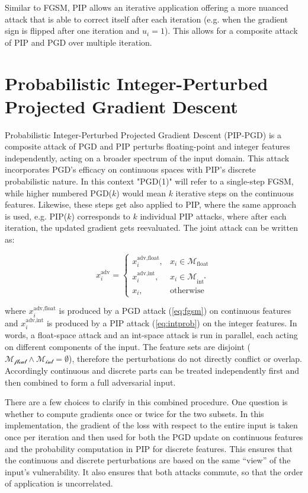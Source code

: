 Similar to FGSM, PIP allows an iterative application offering a more nuanced attack that is able to correct itself after each iteration (e.g. when the gradient sign is flipped after one iteration and $u_i=1$). This allows for a composite attack of PIP and PGD over multiple iteration. 

\section{Probabilistic Integer-Perturbed Projected Gradient Descent}
\label{sec:method_combined}

Probabilistic Integer-Perturbed Projected Gradient Descent (PIP-PGD) is a composite attack of PGD and PIP perturbs floating-point and integer features independently, acting on a broader spectrum of the input domain. This attack incorporates PGD's efficacy on continuous spaces with PIP's discrete probabilistic nature. In this context "PGD(1)" will refer to a single-step FGSM, while higher numbered PGD($k$) would mean $k$ iterative steps on the continuous features. Likewise, these steps get also applied to PIP, where the same approach is used, e.g. PIP($k$) corresponds to $k$ individual PIP attacks, where after each iteration, the updated gradient gets reevaluated. The joint attack can be written as:

\begin{equation}
x_i^{\text{adv}} = 
    \begin{cases} 
    x^{\text{adv,float}}_i, & x_i\in\mathcal{M}_{\text{float}} \\[4pt]
    x^{\text{adv,int}}_i,   & x_i\in\mathcal{M}_{\text{int}^*}   \\[4pt]
    x_i, & \text{otherwise}
    \end{cases}
\label{eq:joint_attack}
\end{equation}

where $x^{\text{adv,float}}_i$ is produced by a PGD attack (\ref{eq:fgsm}) on continuous features and $x^{\text{adv,int}}_i$ is produced by a PIP attack (\ref{eq:intprob}) on the integer features. In words, a float-space attack and an int-space attack is run in parallel, each acting on different components of the input. The feature sets are disjoint ($\mathcal{M_{\text{float}}} \wedge \mathcal{M_{\text{int}}}=\emptyset$), therefore the perturbations do not directly conflict or overlap. Accordingly continuous and discrete parts can be treated independently first and then combined to form a full adversarial input.

There are a few choices to clarify in this combined procedure. One question is whether to compute gradients once or twice for the two subsets. In this implementation, the gradient of the loss with respect to the entire input is taken once per iteration and then used for both the PGD update on continuous features and the probability computation in PIP for discrete features. This ensures that the continuous and discrete perturbations are based on the same “view” of the input’s vulnerability. It also ensures that both attacks commute, so that the order of application is uncorrelated.